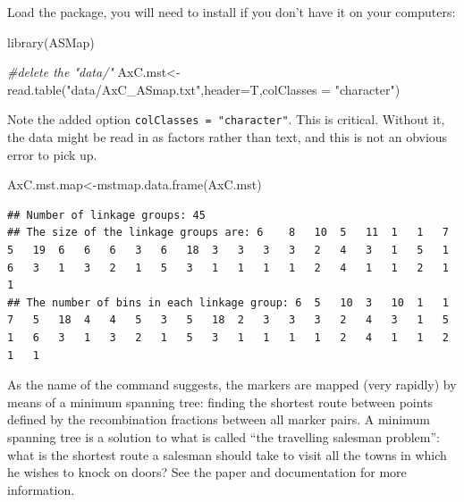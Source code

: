 \documentclass[
]{book}
\newenvironment{Shaded}{\begin{snugshade}}{\end{snugshade}}
\newcommand{\AttributeTok}[1]{\textcolor[rgb]{0.77,0.63,0.00}{#1}}
\newcommand{\CommentTok}[1]{\textcolor[rgb]{0.56,0.35,0.01}{\textit{#1}}}
\newcommand{\FunctionTok}[1]{\textcolor[rgb]{0.00,0.00,0.00}{#1}}
\newcommand{\NormalTok}[1]{#1}
\newcommand{\OtherTok}[1]{\textcolor[rgb]{0.56,0.35,0.01}{#1}}
\newcommand{\StringTok}[1]{\textcolor[rgb]{0.31,0.60,0.02}{#1}}
\begin{document}
Load the package, you will need to install if you don't have it on your computers:

\begin{Shaded}
\begin{Highlighting}[]
\FunctionTok{library}\NormalTok{(ASMap)}
\end{Highlighting}
\end{Shaded}

\begin{Shaded}
\begin{Highlighting}[]
\CommentTok{\#delete the "data/"}
\NormalTok{AxC.mst}\OtherTok{\textless{}{-}}\FunctionTok{read.table}\NormalTok{(}\StringTok{"data/AxC\_ASmap.txt"}\NormalTok{,}\AttributeTok{header=}\NormalTok{T,}\AttributeTok{colClasses =} \StringTok{"character"}\NormalTok{) }
\end{Highlighting}
\end{Shaded}

Note the added option \texttt{colClasses\ =\ "character"}. This is critical. Without it, the data might be read in as factors rather than text, and this is not an obvious error to pick up.

\begin{Shaded}
\begin{Highlighting}[]
\NormalTok{AxC.mst.map}\OtherTok{\textless{}{-}}\FunctionTok{mstmap.data.frame}\NormalTok{(AxC.mst)}
\end{Highlighting}
\end{Shaded}

\begin{verbatim}
## Number of linkage groups: 45
## The size of the linkage groups are: 6    8   10  5   11  1   1   7   5   19  6   6   6   3   6   18  3   3   3   3   2   4   3   1   5   1   6   3   1   3   2   1   5   3   1   1   1   1   2   4   1   1   2   1   1   
## The number of bins in each linkage group: 6  5   10  3   10  1   1   7   5   18  4   4   5   3   5   18  2   3   3   3   2   4   3   1   5   1   6   3   1   3   2   1   5   3   1   1   1   1   2   4   1   1   2   1   1   
\end{verbatim}

As the name of the command suggests, the markers are mapped (very rapidly) by means of a minimum spanning tree: finding the shortest route between points defined by the recombination fractions between all marker pairs. A minimum spanning tree is a solution to what is called ``the travelling salesman problem'': what is the shortest route a salesman should take to visit all the towns in which he wishes to knock on doors? See the paper and documentation for more information.
\end{document}
